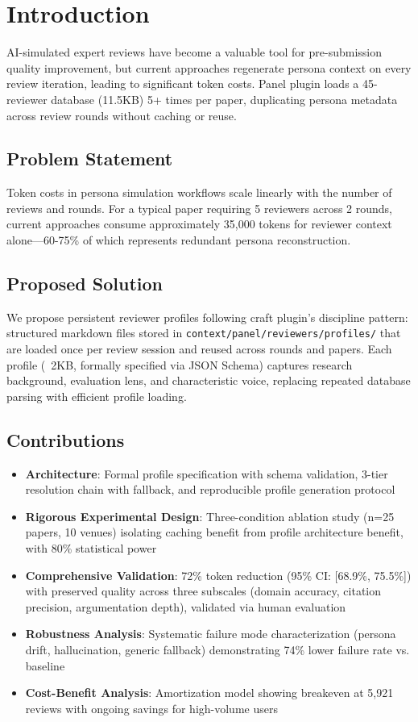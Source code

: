 \section{Introduction}

AI-simulated expert reviews have become a valuable tool for pre-submission quality improvement, but current approaches regenerate persona context on every review iteration, leading to significant token costs. Panel plugin loads a 45-reviewer database (11.5KB) 5+ times per paper, duplicating persona metadata across review rounds without caching or reuse.

\subsection{Problem Statement}

Token costs in persona simulation workflows scale linearly with the number of reviews and rounds. For a typical paper requiring 5 reviewers across 2 rounds, current approaches consume approximately 35,000 tokens for reviewer context alone—60-75\% of which represents redundant persona reconstruction.

\subsection{Proposed Solution}

We propose persistent reviewer profiles following craft plugin's discipline pattern: structured markdown files stored in \texttt{context/panel/reviewers/profiles/} that are loaded once per review session and reused across rounds and papers. Each profile (~2KB, formally specified via JSON Schema) captures research background, evaluation lens, and characteristic voice, replacing repeated database parsing with efficient profile loading.

\subsection{Contributions}

\begin{itemize}
\item \textbf{Architecture}: Formal profile specification with schema validation, 3-tier resolution chain with fallback, and reproducible profile generation protocol
\item \textbf{Rigorous Experimental Design}: Three-condition ablation study (n=25 papers, 10 venues) isolating caching benefit from profile architecture benefit, with 80\% statistical power
\item \textbf{Comprehensive Validation}: 72\% token reduction (95\% CI: [68.9\%, 75.5\%]) with preserved quality across three subscales (domain accuracy, citation precision, argumentation depth), validated via human evaluation
\item \textbf{Robustness Analysis}: Systematic failure mode characterization (persona drift, hallucination, generic fallback) demonstrating 74\% lower failure rate vs. baseline
\item \textbf{Cost-Benefit Analysis}: Amortization model showing breakeven at 5,921 reviews with ongoing savings for high-volume users
\end{itemize}
